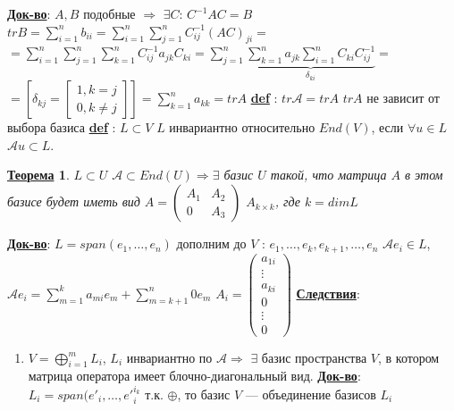 \documentclass[12pt,a4paper]{article}
\newcommand{\bfline}[1]{\textbf{\underline{#1}}}
\newcommand{\Def}{\bfline{def} }
\newtheorem*{theorem*}{\bfline{Теорема}}
\begin{document}
\bfline{Док-во}: $A, B$ подобные $\Rightarrow$ \newline
$\exists C$: $C^{-1} A C = B$ \newline
$tr B = \sum\limits_{i=1}^{n} b_{i i} = \sum\limits_{i=1}^{n} \sum\limits_{j=1}^{n} C^{-1}_{ij} {(AC)}_{ji}=$ \newline
$=\sum\limits_{i=1}^{n} \sum\limits_{j=1}^{n} \sum\limits_{k=1}^{n} C^{-1}_{ij} a_{jk} C_{ki} = \sum\limits_{j=1}^{n} \underset{\delta_{ki}}{\underbrace{\sum\limits_{k=1}^{n} a_{jk} \sum\limits_{i=1}^{n} C_{ki} C^{-1}_{ij}}}=$ \newline
$=\left[ \delta_{kj}=
	\left[
	\begin{matrix}
		1, k=j \\
		0, k \neq j
	\end{matrix}\right]\right]=
\sum\limits_{k=1}^{n} a_{kk} = trA$ \newline
\Def : $tr \mathcal{A} = tr A$ \newline
$tr A$ не зависит от выбора базиса \newline
\Def : $L \subset V$ $L$ инвариантно относительно $End(V)$, если $\forall u \in L$ $\mathcal{A} u \subset L$. \newline
\begin{theorem*}
$L \subset U$ $\mathcal{A} \subset End(U) \Rightarrow \exists$ базис $U$ такой, что матрица $A$ в этом базисе будет иметь вид \newline
$A=
	\left(
	\begin{matrix}
	A_1 & A_2 \\
	0 & A_3
	\end{matrix}
	\right)$ \newline
$A_{k\times k}$, где $k = dim L$
\end{theorem*}
\bfline{Док-во}: $L = span(e_1, \ldots, e_n)$ дополним до $V$ : $e_1, \ldots, e_k, e_{k+1}, \ldots, e_n$ \newline
$\mathcal{A} e_i \in L$, $\mathcal{A} e_i = \sum\limits_{m=1}^{k} a_{mi} e_m + \sum\limits_{m=k+1}^{n} 0 e_m$ \newline
$A_i = 
	\left(
	\begin{matrix}
	a_{1 i} \\
	\vdots \\
	a_{k i} \\
	0 \\
	\vdots\\
	0
	\end{matrix}
	\right)$ \newline
\bfline{Следствия}:
\begin{enumerate}
	\item $V = \bigoplus\limits_{i=1}^{m} L_i$, $L_i$ инвариантно по $\mathcal{A} \Rightarrow$ \newline
		$\exists$ базис пространства $V$, в котором матрица оператора имеет блочно-диагональный вид. \newline
		\bfline{Док-во}:  $L_i = span(e'_i, \ldots, e'^{i_k}_i$ \newline
		т.к. $\oplus$, то базис $V$ --- объединение базисов $L_i$
\end{enumerate}
\end{document}
